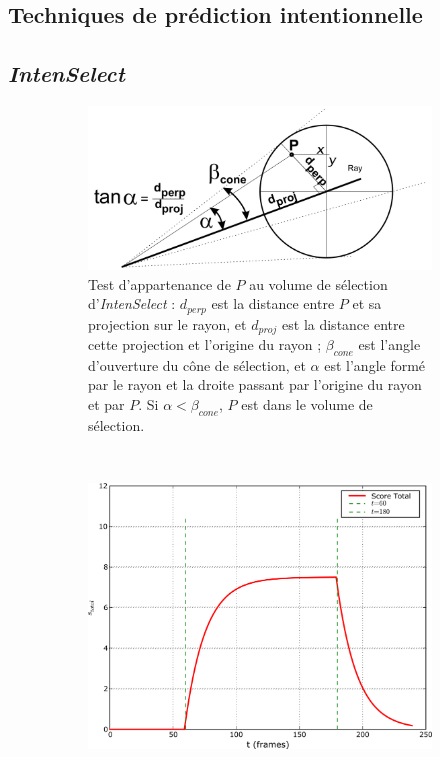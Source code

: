 \begin{appendices}
\section{Techniques de prédiction intentionnelle}

	\subsection{\emph{IntenSelect}}
	
	
	\begin{figure}[htbp]
		\begin{subfigure}[t]{0.49\textwidth}
			\centering
			\includegraphics[width=\textwidth]{figures/ch2/intensCone}
			\caption{Test d'appartenance de $P$ au volume de sélection d'\emph{IntenSelect} : $d_{perp}$ est la distance entre $P$ et sa projection sur le rayon, et $d_{proj}$ est la distance entre cette projection et l'origine du rayon ; $\beta_{cone}$ est l'angle d'ouverture du cône de sélection, et $\alpha$ est l'angle formé par le rayon et la droite passant par l'origine du rayon et par $P$. Si $\alpha < \beta_{cone}$, $P$ est dans le volume de sélection.}
			\label{fig:intensCone}
		\end{subfigure}
		~
		\begin{subfigure}[t]{0.49\textwidth}
			\centering
			\includegraphics[width=\textwidth]{figures/ch2/intensAccumul}

\end{subfigure}
\end{figure}
\end{appendices}
